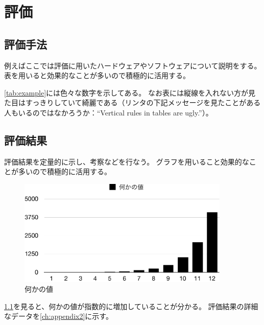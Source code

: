 \chapter{評価}\label{ch:evaluation}

\section{評価手法}\label{sec:methodology}

例えばここでは評価に用いたハードウェアやソフトウェアについて説明をする。
表を用いると効果的なことが多いので積極的に活用する。

\begin{table}[ht]
  \caption{数字が色々書いてある表}{
  \centering
}
\end{table}

\cref{tab:example}には色々な数字を示してある。
なお表には縦線を入れない方が見た目はすっきりしていて綺麗である（リンタの下記メッセージを見たことがある人もいるのではなかろうか：``Vertical rules in tables are ugly.''）。

\section{評価結果}\label{sec:results}

評価結果を定量的に示し、考察などを行なう。
グラフを用いること効果的なことが多いので積極的に活用する。

\begin{figure}[ht]
  \centering
  \includegraphics[width=0.9\textwidth]{examples/graphs/example}
  \caption{何かの値}\label{fig:example}
\end{figure}

\cref{fig:example}を見ると、何かの値が指数的に増加していることが分かる。
評価結果の詳細なデータを\cref{ch:appendix2}に示す。